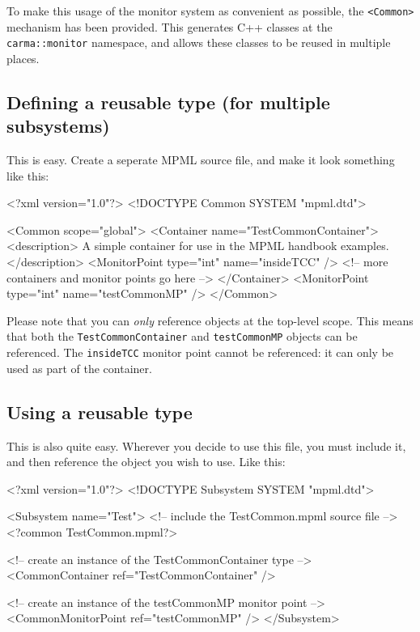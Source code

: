 \documentclass[letterpaper,12pt,oneside,pdftex]{article}
\newcommand{\shadebox}[1]{\fcolorbox{black}{shade}{\begin{minipage}{\textwidth}#1\end{minipage}}}
\newcommand{\mpml}[1]{\texttt{<#1>}}
\begin{document}
To make this usage of the monitor system as convenient as possible, the
\mpml{Common} mechanism has been provided. This generates C++ classes at the
\texttt{carma::monitor} namespace, and allows these classes to be reused in
multiple places.

\subsection{Defining a reusable type (for multiple subsystems)}

This is easy. Create a seperate MPML source file, and make it look something
like this:

\begin{verbbox}
<?xml version="1.0"?>
<!DOCTYPE Common SYSTEM "mpml.dtd">

<Common scope="global">
    <Container name="TestCommonContainer">
        <description>
            A simple container for use in the MPML handbook examples.
        </description>
        <MonitorPoint type="int" name="insideTCC" />
        <!-- more containers and monitor points go here -->
    </Container>
    <MonitorPoint type="int" name="testCommonMP" />
</Common>
\end{verbbox}
\shadebox{\theverbbox}

Please note that you can \emph{only} reference objects at the top-level scope.
This means that both the \texttt{TestCommonContainer} and \texttt{testCommonMP}
objects can be referenced. The \texttt{insideTCC} monitor point
cannot be referenced: it can only be used as part of the container.

\subsection{Using a reusable type}

This is also quite easy. Wherever you decide to use this file, you must include
it, and then reference the object you wish to use. Like this:

\begin{verbbox}
<?xml version="1.0"?>
<!DOCTYPE Subsystem SYSTEM "mpml.dtd">

<Subsystem name="Test">
    <!-- include the TestCommon.mpml source file -->
    <?common TestCommon.mpml?>

    <!-- create an instance of the TestCommonContainer type -->
    <CommonContainer ref="TestCommonContainer" />

    <!-- create an instance of the testCommonMP monitor point -->
    <CommonMonitorPoint ref="testCommonMP" />
</Subsystem>
\end{verbbox}
\shadebox{\theverbbox}
\end{document}
